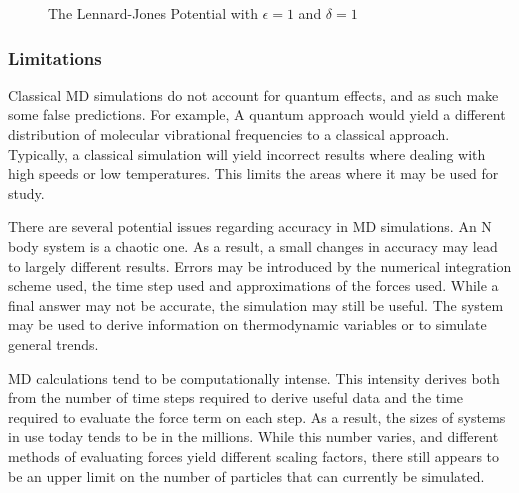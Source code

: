 \begin{figure}
    
    \caption{The Lennard-Jones Potential with $\epsilon=1$ and $\delta=1$}
\end  {figure}




%
%
\subsubsection{Limitations}

Classical MD simulations do not account for quantum effects,
and as such make some false predictions.
%
For example, A quantum approach would yield
a different distribution of molecular vibrational frequencies
to a classical approach.
%
Typically, a classical simulation will yield incorrect results where
dealing with high speeds or low temperatures.
%
This limits the areas where it may be used for study.



There are several potential issues regarding
accuracy in MD simulations.
%
An N body system is a chaotic one.
%
As a result, a small changes in accuracy may lead to largely different results.
%
Errors may be introduced by the numerical integration scheme used,
the time step used and
approximations of the forces used.
%
While a final answer may not be accurate, the simulation may still be useful.
%
The system may be used to derive information on thermodynamic variables
or to simulate general trends.


MD calculations tend to be computationally intense.
%
This intensity derives both from
the number of time steps required to derive useful data and
the time required to evaluate the force term on each step.
%
As a result, the sizes of systems in use today tends to be in
the millions.
%
While this number varies, and different methods of evaluating forces
yield different scaling factors, there still appears to be an upper limit
on the number of particles that can currently be simulated.
